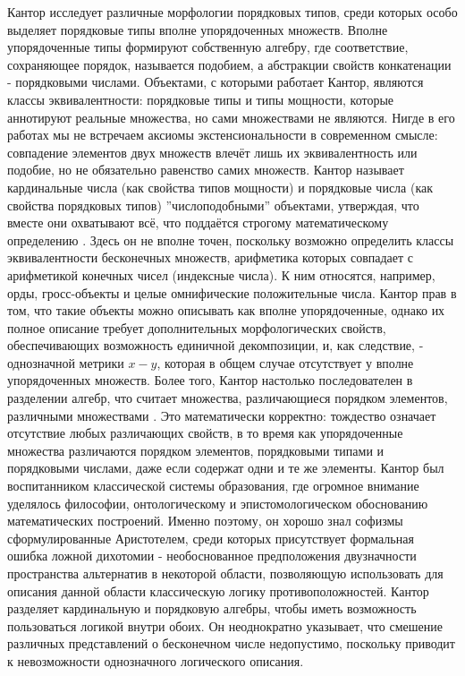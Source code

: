 \documentclass[12pt]{article}
\begin{document}
Кантор исследует различные морфологии порядковых типов, среди которых особо выделяет порядковые типы вполне упорядоченных множеств. Вполне упорядоченные типы формируют собственную алгебру, где соответствие, сохраняющее порядок, называется подобием, а абстракции свойств конкатенации - порядковыми числами. Объектами, с которыми работает Кантор, являются классы эквивалентности: порядковые типы и типы мощности, которые аннотируют реальные множества, но сами множествами не являются. Нигде в его работах мы не встречаем аксиомы экстенсиональности в современном смысле: совпадение элементов двух множеств влечёт лишь их эквивалентность или подобие, но не обязательно равенство самих множеств. Кантор называет кардинальные числа (как свойства типов мощности) и порядковые числа (как свойства порядковых типов) ''числоподобными'' объектами, утверждая, что вместе они охватывают всё, что поддаётся строгому математическому определению \cite{cantor-numberlike}. Здесь он не вполне точен, поскольку возможно определить классы эквивалентности бесконечных множеств, арифметика которых совпадает с арифметикой конечных чисел (индексные числа). К ним относятся, например, орды, гросс-объекты и целые омнифические положительные числа. Кантор прав в том, что такие объекты можно описывать как вполне упорядоченные, однако их полное описание требует дополнительных морфологических свойств, обеспечивающих возможность единичной декомпозиции, и, как следствие, - однозначной метрики $x - y$, которая в общем случае отсутствует у вполне упорядоченных множеств. Более того, Кантор настолько последователен в разделении алгебр, что считает множества, различающиеся порядком элементов, различными множествами \cite{cantor-order-difference}. Это математически корректно: тождество означает отсутствие любых различающих свойств, в то время как упорядоченные множества различаются порядком элементов, порядковыми типами и порядковыми числами, даже если содержат одни и те же элементы. Кантор был воспитанником классической системы образования, где огромное внимание уделялось философии, онтологическому и эпистомологическом обоснованию математических построений. Именно поэтому, он хорошо знал софизмы сформулированные Аристотелем, среди которых присутствует формальная ошибка ложной дихотомии - необоснованное предположения двузначности пространства альтернатив в некоторой области, позволяющую использовать для описания данной области классическую логику противоположностей. Кантор разделяет кардинальную и порядковую алгебры, чтобы иметь возможность пользоваться логикой внутри обоих. Он неоднократно указывает, что смешение различных представлений о бесконечном числе недопустимо, поскольку приводит к невозможности однозначного логического описания. 
\end{document}
